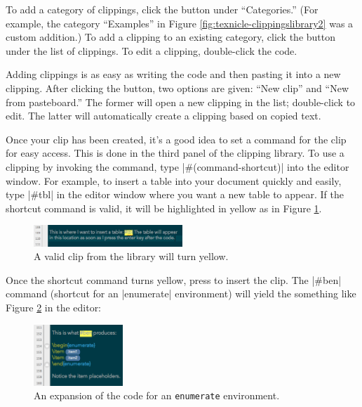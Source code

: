 To add a category of clippings, click the \menu{+} button under ``Categories.'' (For example, the category ``Examples'' in Figure \ref{fig:texnicle-clippingslibrary2} was a custom addition.) To add a clipping to an existing category, click the \menu{+} button under the list of clippings. To edit a clipping, double-click the code.

Adding clippings is as easy as writing the code and then pasting it into a new clipping. After clicking the \menu{+} button, two options are given: ``New clip'' and ``New from pasteboard.'' The former will open a new clipping in the list; double-click to edit. The latter will automatically create a clipping based on copied text.

Once your clip has been created, it's a good idea to set a command for the clip for easy access. This is done in the third panel of the clipping library. To use a clipping by invoking the command, type |#(command-shortcut)| into the editor window. For example, to insert a table into your document quickly and easily, type |#tbl| in the editor window where you want a new table to appear. If the shortcut command is valid, it will be highlighted in yellow as in Figure \ref{fig:texnicle-validclip}.


\begin{figure}[htbp]
\centering
\includegraphics[width=0.5\textwidth]{texnicle-validclip.jpg}
\caption{A valid clip from the library will turn yellow.}
\label{fig:texnicle-validclip}
\end{figure}

Once the shortcut command turns yellow, press \keys{\returnkey} to insert the clip. The |#ben| command (shortcut for an |enumerate| environment) will yield the something like Figure \ref{fig:texnicle-benexpanded} in the editor:
\begin{figure}[htbp]
\centering
\includegraphics[width=0.3\textwidth]{TeXnicle-Images/texnicle-benexpanded.png}
\caption{An expansion of the code for an \texttt{enumerate} environment.}
\label{fig:texnicle-benexpanded}
\end{figure}


